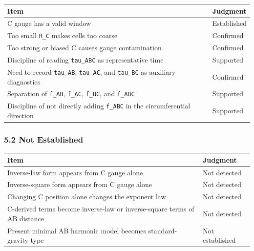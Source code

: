\documentclass[
]{article}
\newcounter{none} %
\begin{document}
{\def\LTcaptype{none} %
\begin{longtable}[]{@{}
  >{\raggedright\arraybackslash}p{}
  >{\raggedright\arraybackslash}p{}@{}}
\toprule\noalign{}
\begin{minipage}[b]{\linewidth}\raggedright
Item
\end{minipage} & \begin{minipage}[b]{\linewidth}\raggedright
Judgment
\end{minipage} \\
\midrule\noalign{}
\endhead
\bottomrule\noalign{}
\endlastfoot
C gauge has a valid window & Established \\
Too small \texttt{R\_C} makes cells too coarse & Confirmed \\
Too strong or biased C causes gauge contamination & Confirmed \\
Discipline of reading \texttt{tau\_ABC} as representative time &
Supported \\
Need to record \texttt{tau\_AB}, \texttt{tau\_AC}, and \texttt{tau\_BC}
as auxiliary diagnostics & Confirmed \\
Separation of \texttt{f\_AB}, \texttt{f\_AC}, \texttt{f\_BC}, and
\texttt{f\_ABC} & Supported \\
Discipline of not directly adding \texttt{f\_ABC} in the circumferential
direction & Supported \\
\end{longtable}
}

\subsubsection{5.2 Not Established}\label{not-established}

{\def\LTcaptype{none} %
\begin{longtable}[]{@{}
  >{\raggedright\arraybackslash}p{}
  >{\raggedright\arraybackslash}p{}@{}}
\toprule\noalign{}
\begin{minipage}[b]{\linewidth}\raggedright
Item
\end{minipage} & \begin{minipage}[b]{\linewidth}\raggedright
Judgment
\end{minipage} \\
\midrule\noalign{}
\endhead
\bottomrule\noalign{}
\endlastfoot
Inverse-law form appears from C gauge alone & Not detected \\
Inverse-square form appears from C gauge alone & Not detected \\
Changing C position alone changes the exponent law & Not detected \\
C-derived terms become inverse-law or inverse-square terms of AB
distance & Not detected \\
Present minimal AB harmonic model becomes standard-gravity type & Not
established \\
\end{longtable}
}
\end{document}
